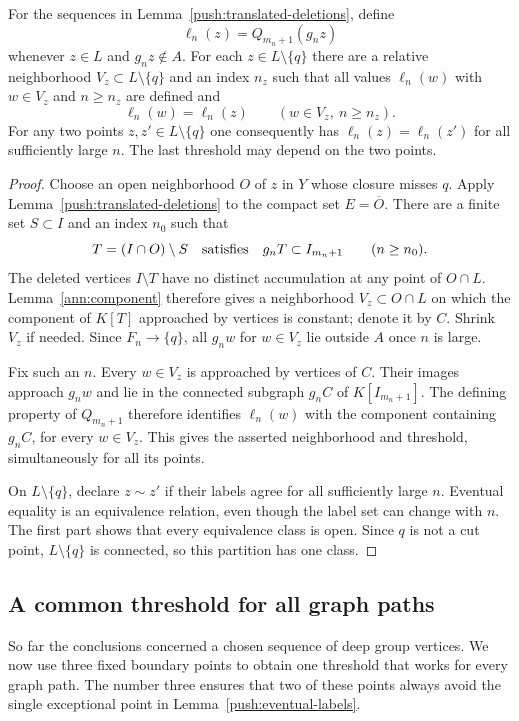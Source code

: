 \begin{lemma}\label{push:eventual-labels}
For the sequences in Lemma~\ref{push:translated-deletions}, define
\[
 \ell_n(z)=Q_{m_n+1}(g_nz)
\]
whenever $z\in L$ and $g_nz\notin A$.
For each $z\in L\setminus\{q\}$ there are a relative neighborhood
$V_z\subset L\setminus\{q\}$ and an index $n_z$ such that all values
$\ell_n(w)$ with $w\in V_z$ and $n\ge n_z$ are defined and
\[
 \ell_n(w)=\ell_n(z)\qquad(w\in V_z,\ n\ge n_z).
\]
For any two points $z,z'\in L\setminus\{q\}$ one consequently has
$\ell_n(z)=\ell_n(z')$ for all sufficiently large $n$.
The last threshold may depend on the two points.
\end{lemma}
\begin{proof}
Choose an open neighborhood $O$ of $z$ in $Y$ whose closure misses $q$.
Apply Lemma~\ref{push:translated-deletions} to the compact set
$E=\overline O$. There are a finite set
$S\subset I$ and an index $n_0$ such that
\[
 T=(I\cap O)\setminus S\quad\hbox{satisfies}\quad
 g_nT\subset I_{m_n+1}\qquad(n\ge n_0).
\]
The deleted vertices $I\setminus T$ have no distinct accumulation at any
point of $O\cap L$.  Lemma~\ref{ann:component} therefore gives a
neighborhood $V_z\subset O\cap L$ on which the component of $K[T]$
approached by vertices is constant; denote it by $C$.
Shrink $V_z$ if needed.  Since $F_n\to\{q\}$, all $g_nw$ for
$w\in V_z$ lie outside $A$ once $n$ is large.

Fix such an $n$.  Every $w\in V_z$ is approached by vertices of $C$.
Their images approach $g_nw$ and lie in the connected subgraph $g_nC$
of $K[I_{m_n+1}]$.
The defining property of $Q_{m_n+1}$ therefore identifies
$\ell_n(w)$ with the component containing $g_nC$, for every $w\in V_z$.
This gives the asserted neighborhood and threshold, simultaneously for
all its points.

On $L\setminus\{q\}$, declare $z\sim z'$ if their labels agree for all
sufficiently large $n$.  Eventual equality is an equivalence relation,
even though the label set can change with $n$.
The first part shows that every equivalence class is open.
Since $q$ is not a cut point, $L\setminus\{q\}$ is connected, so this
partition has one class.
\end{proof}

\subsection{A common threshold for all graph paths}

So far the conclusions concerned a chosen sequence of deep group
vertices.  We now use three fixed boundary points to obtain one
threshold that works for every graph path.  The number three ensures
that two of these points always avoid the single exceptional point in
Lemma~\ref{push:eventual-labels}.

